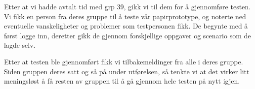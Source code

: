 Etter at vi hadde avtalt tid med grp 39, gikk vi til dem for å gjennomføre testen. Vi fikk en person fra deres gruppe til å teste vår papirprototype, og noterte ned eventuelle vanskeligheter og problemer som testpersonen fikk. De begynte med å først logge inn, deretter gikk de gjennom forskjellige oppgaver og scenario som de lagde selv. 

Etter at testen ble gjennomført fikk vi tilbakemeldinger fra alle i deres gruppe. Siden gruppen deres satt og så på under utførelsen, så tenkte vi at det virker litt meningsløst å få resten av gruppen til å gå gjennom hele testen på nytt igjen.